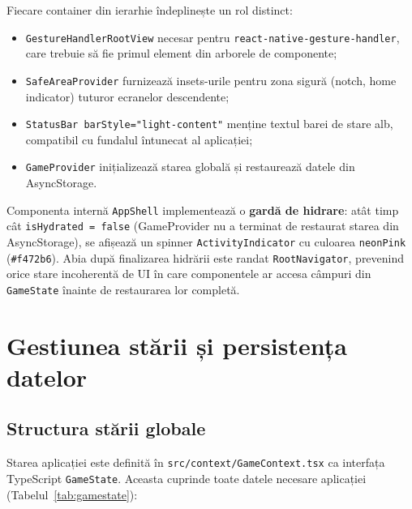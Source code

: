 \documentclass[12pt, a4paper, twoside]{report}
\numberwithin{equation}{section}
\begin{document}
Fiecare container din ierarhie îndeplinește un rol distinct:
\begin{itemize}
  \item \texttt{GestureHandlerRootView} \textemdash{} necesar pentru
    \texttt{react-native-gesture-handler}, care trebuie să fie primul element
    din arborele de componente;
  \item \texttt{SafeAreaProvider} \textemdash{} furnizează insets-urile pentru
    zona sigură (notch, home indicator) tuturor ecranelor descendente;
  \item \texttt{StatusBar barStyle="light-content"} \textemdash{} menține
    textul barei de stare alb, compatibil cu fundalul întunecat al aplicației;
  \item \texttt{GameProvider} \textemdash{} inițializează starea globală și
    restaurează datele din AsyncStorage.
\end{itemize}

Componenta internă \texttt{AppShell} implementează o \textbf{gardă de hidrare}:
atât timp cât \texttt{isHydrated = false} (GameProvider nu a terminat de restaurat
starea din AsyncStorage), se afișează un spinner \texttt{ActivityIndicator} cu
culoarea \texttt{neonPink} (\texttt{\#f472b6}). Abia după finalizarea hidrării
este randat \texttt{RootNavigator}, prevenind orice stare incoherentă de UI în
care componentele ar accesa câmpuri din \texttt{GameState} înainte de
restaurarea lor completă.

\chapter{Gestiunea stării și persistența datelor}

\section{Structura stării globale}

Starea aplicației este definită în \texttt{src/context/GameContext.tsx} ca interfața
TypeScript \texttt{GameState}. Aceasta cuprinde toate datele necesare aplicației (Tabelul~\ref{tab:gamestate}):
\end{document}
